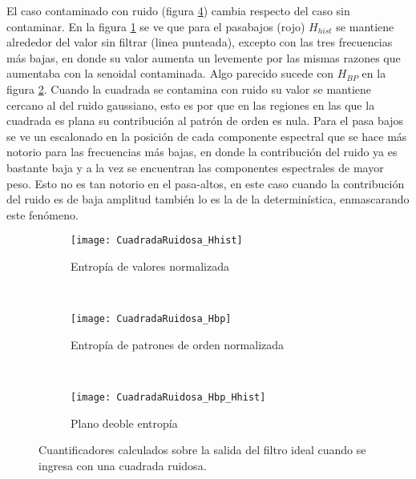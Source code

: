 El caso contaminado con ruido (figura \ref{fig:CuadradaRuidosa}) cambia respecto del caso sin contaminar. En la figura \ref{subfig:CuadradaRuidosa_Hhist} se ve que para el pasabajos (rojo) $H_{hist}$ se mantiene alrededor del valor sin filtrar (linea punteada), excepto con las tres frecuencias más bajas, en donde su valor aumenta un levemente por las mismas razones que aumentaba con la senoidal contaminada.
Algo parecido sucede con $H_{BP}$ en la figura \ref{subfig:CuadradaRuidosa_Hbp}. Cuando la cuadrada se contamina con ruido su valor se mantiene cercano al del ruido gaussiano, esto es por que en las regiones en las que la cuadrada es plana su contribución al patrón de orden es nula. Para el pasa bajos se ve un escalonado en la posición de cada componente espectral que se hace más notorio para las frecuencias más bajas, en donde la contribución del ruido ya es bastante baja y a la vez se encuentran las componentes espectrales de mayor peso. Esto no es tan notorio en el pasa-altos, en este caso cuando la contribución del ruido es de baja amplitud también lo es la de la determinística, enmascarando este fenómeno.
%
\begin{figure}[h]
    \centering
    \begin{subfigure}[t]{0.32\textwidth}
        \texttt{[image: CuadradaRuidosa\_Hhist]}
        \caption{Entropía de valores normalizada}
        \label{subfig:CuadradaRuidosa_Hhist}
    \end{subfigure}
    ~ %
    \begin{subfigure}[t]{0.32\textwidth}
        \texttt{[image: CuadradaRuidosa\_Hbp]}
        \caption{Entropía de patrones de orden normalizada}
        \label{subfig:CuadradaRuidosa_Hbp}
    \end{subfigure}
    ~ %
    \begin{subfigure}[t]{0.32\textwidth}
        \texttt{[image: CuadradaRuidosa\_Hbp\_Hhist]}
        \caption{Plano deoble entropía}
        \label{subfig:CuadradaRuidosa_HbpHhist}
    \end{subfigure}
    \caption{Cuantificadores calculados sobre la salida del filtro ideal cuando se ingresa con una cuadrada ruidosa.}\label{fig:CuadradaRuidosa}
\end{figure}

